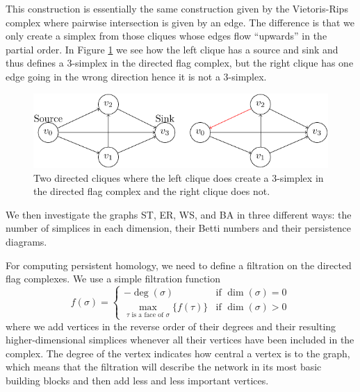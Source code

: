 This construction is essentially the same construction given by the Vietoris-Rips complex where pairwise intersection is given by an edge. The difference is that we only create a simplex from those cliques whose edges flow ``upwards'' in the partial order. In Figure \ref{disimplex} we see how the left clique has a source and sink and thus defines a $3$-simplex in the directed flag complex, but the right clique has one edge going in the wrong direction hence it is not a $3$-simplex.


\begin{figure}[ht]
  \centering
  \includegraphics[]{./3simplex.pdf}
  \caption{\label{disimplex} Two directed cliques where the left clique does create a 3-simplex in the directed flag complex and the right clique does not.}
\end{figure}

We then investigate the graphs ST, ER, WS, and BA in three different ways: the number of simplices in each dimension, their Betti numbers and their persistence diagrams.

For computing persistent homology, we need to define a filtration on the directed flag complexes.
We use a simple filtration function
\[
  f(\sigma) = \begin{cases}
    -\deg(\sigma) & \text{if } \dim(\sigma) = 0 \\
    \max_{\tau \text{ is a face of } \sigma} \{ f(\tau) \} & \text{if } \dim(\sigma) > 0
  \end{cases}
\] where we add vertices in the reverse order of their degrees and their resulting higher-dimensional simplices whenever all their vertices have been included in the complex. The degree of the vertex indicates how central a vertex is to the graph, which means that the filtration will describe the network in its most basic building blocks and then add less and less important vertices.
